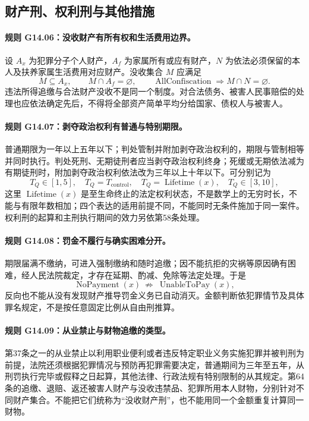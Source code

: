 \subsection{财产刑、权利刑与其他措施}
\paragraph{规则 G14.06：没收财产有所有权和生活费用边界。}
设 $A_x$ 为犯罪分子个人财产，$A_f$ 为家属所有或应有财产，$N$ 为依法必须保留的本人及扶养家属生活费用对应财产。没收集合 $M$ 应满足
\[
M\subseteq A_x,\qquad M\cap A_f=\varnothing,\qquad
\operatorname{AllConfiscation}\Longrightarrow M\cap N=\varnothing.
\]
违法所得追缴与合法财产没收不是同一个制度。对合法债务、被害人民事赔偿的处理也应依法确定先后，不得将全部资产简单平均分给国家、债权人与被害人。

\paragraph{规则 G14.07：剥夺政治权利有普通与特别期限。}
普通期限为一年以上五年以下；判处管制并附加剥夺政治权利的，期限与管制相等并同时执行。判处死刑、无期徒刑者应当剥夺政治权利终身；死缓或无期依法减为有期徒刑时，附加剥夺政治权利依法改为三年以上十年以下。可分别记为
\[
T_Q\in[1,5],\quad T_Q=T_{\mathrm{control}},\quad
T_Q=\operatorname{Lifetime}(x),\quad T_Q\in[3,10],
\]
这里 $\operatorname{Lifetime}(x)$ 是至生命终止的法定权利状态，不是数学上的无穷时长，不能与有限年数相加；四个表达的适用前提不同，不能同时无条件施加于同一案件。权利刑的起算和主刑执行期间的效力另依第58条处理。

\paragraph{规则 G14.08：罚金不履行与确实困难分开。}
期限届满不缴纳，可进入强制缴纳和随时追缴；因不能抗拒的灾祸等原因确有困难，经人民法院裁定，才存在延期、酌减、免除等法定处理。于是
\[
\operatorname{NoPayment}(x)\ \not\Longrightarrow\
\operatorname{UnableToPay}(x),
\]
反向也不能从没有发现财产推导罚金义务已自动消灭。金额判断依犯罪情节及具体罪名规定，不是按任意固定比例从自由刑推算。

\paragraph{规则 G14.09：从业禁止与财物追缴的类型。}
第37条之一的从业禁止以利用职业便利或者违反特定职业义务实施犯罪并被判刑为前提，法院还须根据犯罪情况与预防再犯罪需要决定，普通期间为三年至五年，从刑罚执行完毕或假释之日起算，其他法律、行政法规有特别限制的从其规定。第64条的追缴、退赔、返还被害人财产与没收违禁品、犯罪所用本人财物，分别针对不同财产集合。不能把它们统称为“没收财产刑”，也不能用同一个金额重复计算同一财物。

